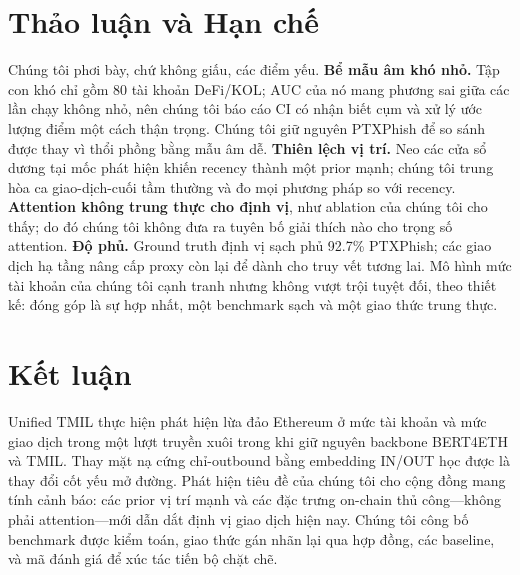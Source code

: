 \documentclass[conference]{IEEEtran}
\begin{document}
\section{Thảo luận và Hạn chế}
Chúng tôi phơi bày, chứ không giấu, các điểm yếu. \textbf{Bể mẫu âm khó nhỏ.} Tập
con khó chỉ gồm 80 tài khoản DeFi/KOL; AUC của nó mang phương sai giữa các lần chạy
không nhỏ, nên chúng tôi báo cáo CI có nhận biết cụm và xử lý ước lượng điểm một
cách thận trọng. Chúng tôi giữ nguyên PTXPhish để so sánh được thay vì thổi phồng
bằng mẫu âm dễ. \textbf{Thiên lệch vị trí.} Neo các cửa sổ dương tại mốc phát hiện
khiến recency thành một prior mạnh; chúng tôi trung hòa ca giao-dịch-cuối tầm thường
và đo mọi phương pháp so với recency. \textbf{Attention không trung thực cho định
vị}, như ablation của chúng tôi cho thấy; do đó chúng tôi không đưa ra tuyên bố giải
thích nào cho trọng số attention. \textbf{Độ phủ.} Ground truth định vị sạch phủ
92.7\% PTXPhish; các giao dịch hạ tầng nâng cấp proxy còn lại để dành cho truy vết
tương lai. Mô hình mức tài khoản của chúng tôi cạnh tranh nhưng không vượt trội
tuyệt đối, theo thiết kế: đóng góp là sự hợp nhất, một benchmark sạch và một giao
thức trung thực.

\section{Kết luận}
Unified TMIL thực hiện phát hiện lừa đảo Ethereum ở mức tài khoản và mức giao dịch
trong một lượt truyền xuôi trong khi giữ nguyên backbone BERT4ETH và TMIL. Thay mặt
nạ cứng chỉ-outbound bằng embedding IN/OUT học được là thay đổi cốt yếu mở đường.
Phát hiện tiêu đề của chúng tôi cho cộng đồng mang tính cảnh báo: các prior vị trí
mạnh và các đặc trưng on-chain thủ công---không phải attention---mới dẫn dắt định vị
giao dịch hiện nay. Chúng tôi công bố benchmark được kiểm toán, giao thức gán nhãn
lại qua hợp đồng, các baseline, và mã đánh giá để xúc tác tiến bộ chặt chẽ.
\end{document}
